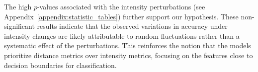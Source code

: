 The high $p$-values associated with the intensity perturbations (see Appendix~\ref{appendix:statistic_tables}) further support our hypothesis. These non-significant results indicate that the observed variations in accuracy under intensity changes are likely attributable to random fluctuations rather than a systematic effect of the perturbations. This reinforces the notion that the models prioritize distance metrics over intensity metrics, focusing on the features close to decision boundaries for classification.